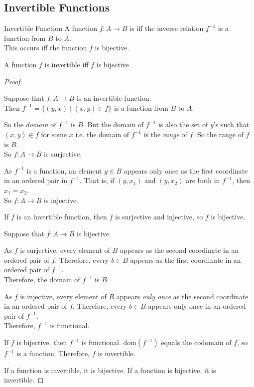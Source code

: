 \documentclass[../notes.tex]{subfiles}
\begin{document}
			\subsection{Invertible Functions}
				\begin{definition}{Invertible Function}
					A function $f: A \rightarrow B$ is  iff the inverse relation $f^{-1}$ is a function from $B$ to $A$.\\
					This occurs iff the function $f$ is bijective.
				\end{definition}
				\begin{theorem}{A function $f$ is invertible iff $f$ is bijective}
					\begin{proof}
						$ $
						\begin{indentparagraph}
							\begin{subproof}[Subproof]
								Suppose that $f: A \rightarrow B$ is an invertible function.\\
								Then $f^{-1} = \bigl\{(y, x) \mid (x, y) \in f\bigr\}$ is a function from $B$ to $A$.

								So the \emph{domain} of $f^{-1}$ is $B$. But the domain of $f^{-1}$ is also the set of $y$'s such that $(x, y) \in f$ for some $x$ i.e. the domain of $f^{-1}$ is the \emph{range} of $f$. So the range of $f$ is $B$.\\
								So $f: A \rightarrow B$ is surjective.

								As $f^{-1}$ is a function, an element $y \in B$ appears only once as the first coordinate in an ordered pair in $f^{-1}$. That is, if $(y, x_{1})$ and $(y, x_{2})$ are both in $f^{-1}$, then $x_{1} = x_{2}$.\\
								So $f: A \rightarrow B$ is injective.

								If $f$ is an invertible function, then $f$ is surjective and injective, so $f$ is bijective.
							\end{subproof}
							\begin{subproof}[Subproof]
								Suppose that $f: A \rightarrow B$ is bijective.

								As $f$ is surjective, every element of $B$ appears as the second coordinate in an ordered pair of $f$. Therefore, every $b \in B$ appears as the first coordinate in an ordered pair of $f^{-1}$.\\
								Therefore, the domain of $f^{-1}$ is $B$.

								As $f$ is injective, every element of $B$ appears \emph{only once} as the second coordinate in an ordered pair of $f$. Therefore, every $b \in B$ appears only once in an ordered pair of $f^{-1}$.\\
								Therefore, $f^{-1}$ is functional.

								If $f$ is bijective, then $f^{-1}$ is functional. $\mathrm{dom}(f^{-1})$ equals the codomain of $f$, so $f^{-1}$ is a function. Therefore, $f$ is invertible.
							\end{subproof}
						\end{indentparagraph}
						If a function is invertible, it is bijective. If a function is bijective, it is invertible.
					\end{proof}
				\end{theorem}
\end{document}
